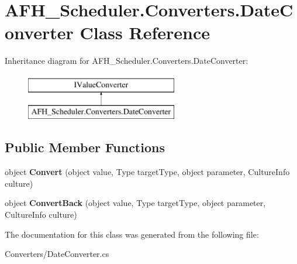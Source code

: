 \section{A\+F\+H\+\_\+\+Scheduler.\+Converters.\+Date\+Converter Class Reference}
\label{class_a_f_h___scheduler_1_1_converters_1_1_date_converter}
Inheritance diagram for A\+F\+H\+\_\+\+Scheduler.\+Converters.\+Date\+Converter\+:\begin{figure}[H]
\begin{center}
\leavevmode
\includegraphics[height=2.000000cm]{class_a_f_h___scheduler_1_1_converters_1_1_date_converter}
\end{center}
\end{figure}
\subsection*{Public Member Functions}
\begin{DoxyCompactItemize}
\item 
\mbox{\label{class_a_f_h___scheduler_1_1_converters_1_1_date_converter_a41aa14f607ff873dbd0883b1b92b253f}} 
object {\bfseries Convert} (object value, Type target\+Type, object parameter, Culture\+Info culture)
\item 
\mbox{\label{class_a_f_h___scheduler_1_1_converters_1_1_date_converter_a7fd56cb248c4cec7e1004c52da3a2e2f}} 
object {\bfseries Convert\+Back} (object value, Type target\+Type, object parameter, Culture\+Info culture)
\end{DoxyCompactItemize}


The documentation for this class was generated from the following file\+:\begin{DoxyCompactItemize}
\item 
Converters/Date\+Converter.\+cs\end{DoxyCompactItemize}
